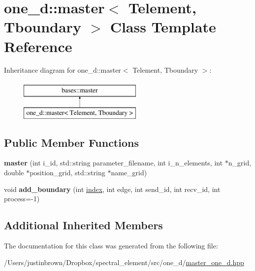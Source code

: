 \hypertarget{classone__d_1_1master}{\section{one\-\_\-d\-:\-:master$<$ Telement, Tboundary $>$ Class Template Reference}
\label{classone__d_1_1master}
}
Inheritance diagram for one\-\_\-d\-:\-:master$<$ Telement, Tboundary $>$\-:\begin{figure}[H]
\begin{center}
\leavevmode
\includegraphics[height=2.000000cm]{classone__d_1_1master}
\end{center}
\end{figure}
\subsection*{Public Member Functions}
\begin{DoxyCompactItemize}
\item 
\hypertarget{classone__d_1_1master_aeaf8bbb4fb15a522e5fd4884bda995ca}{{\bfseries master} (int i\-\_\-id, std\-::string parameter\-\_\-filename, int i\-\_\-n\-\_\-elements, int $\ast$n\-\_\-grid, double $\ast$position\-\_\-grid, std\-::string $\ast$name\-\_\-grid)}\label{classone__d_1_1master_aeaf8bbb4fb15a522e5fd4884bda995ca}

\item 
\hypertarget{classone__d_1_1master_a3cbad7fa6562b2bf640e8c7c2da51a63}{void {\bfseries add\-\_\-boundary} (int \hyperlink{plan_8hpp_a6784e1c334dfceb8f017667c0b0f6a3e}{index}, int edge, int send\-\_\-id, int recv\-\_\-id, int process=-\/1)}\label{classone__d_1_1master_a3cbad7fa6562b2bf640e8c7c2da51a63}

\end{DoxyCompactItemize}
\subsection*{Additional Inherited Members}


The documentation for this class was generated from the following file\-:\begin{DoxyCompactItemize}
\item 
/\-Users/justinbrown/\-Dropbox/spectral\-\_\-element/src/one\-\_\-d/\hyperlink{master__one__d_8hpp}{master\-\_\-one\-\_\-d.\-hpp}\end{DoxyCompactItemize}
